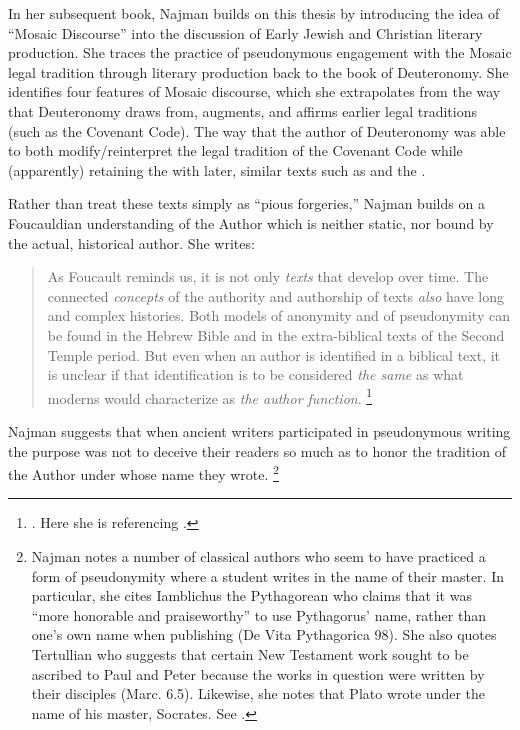 In her subsequent book, Najman builds on this thesis by introducing the idea of ``Mosaic Discourse'' into the discussion of Early Jewish and Christian literary production. She traces the practice of pseudonymous engagement with the Mosaic legal tradition through literary production back to the book of Deuteronomy.\autocite[48]{najman2003} She identifies four features of Mosaic discourse, which she extrapolates from the way that Deuteronomy draws from, augments, and affirms earlier legal traditions (such as the Covenant Code).
The way that the author of Deuteronomy was able to both modify/reinterpret the legal tradition of the Covenant Code while (apparently) retaining the  with later, similar \psgraphical texts such as \jub and the \templescroll. 

Rather than treat these \psgraphical texts simply as ``pious forgeries,'' Najman builds on a Foucauldian understanding of the Author which is neither static, nor bound by the actual, historical author. She writes:

\begin{quote}
    As Foucault reminds us, it is not only \emph{texts} that develop over time. The connected \emph{concepts} of the authority and authorship of texts \emph{also} have long and complex histories. Both models of anonymity and of pseudonymity can be found in the Hebrew Bible and in the extra-biblical texts of the Second Temple period. But even when an author is identified in a biblical text, it is unclear if that identification is to be considered \emph{the same} as what moderns would characterize as \emph{the author function}.%
        \footnote{%
            \cite[9--10]{najman2003}. Here she is referencing
            \cite[213]{foucault_essential-foucault_2}.}
\end{quote}
\noindent
Najman suggests that when ancient writers participated in pseudonymous writing the purpose was not to deceive their readers so much as to honor the tradition of the Author under whose name they wrote.%
    \footnote{Najman notes a number of classical authors who seem to have practiced a form of pseudonymity where a student writes in the name of their master. In particular, she cites Iamblichus the Pythagorean who claims that it was ``more honorable and praiseworthy'' to use Pythagorus' name, rather than one's own name when publishing (De Vita Pythagorica 98). She also quotes Tertullian who suggests that certain New Testament work sought to be ascribed to Paul and Peter because the works in question were written by their disciples (Marc. 6.5). Likewise, she notes that Plato wrote under the name of his master, Socrates. See \cite[13]{najman2003}.}

